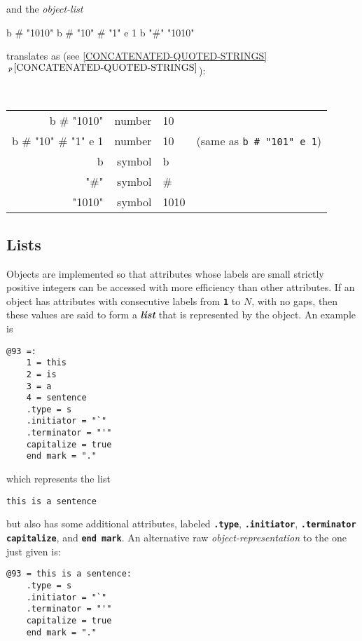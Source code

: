\documentclass[12pt]{article}
\newcommand{\TT}[1]{{\tt \bfseries #1}}
\newcommand{\key}[1]{{\bf \em #1}\index{#1}}
\newcommand{\secref}[1]{\ref{#1}$\,^{p\,\pageref{#1}}$}
\newenvironment{indpar}[1][0.3in]%
	{\begin{list}{}%
		     {\setlength{\itemsep}{0in}%
		      \setlength{\topsep}{0in}%
		      \setlength{\parsep}{1ex}%
		      \setlength{\labelwidth}{#1}%
		      \setlength{\leftmargin}{#1}%
		      \addtolength{\leftmargin}{\labelsep}}%
	 \item}%
	{\end{list}}
\begin{document}
and the {\em object-list}

\begin{center}
b \# "1010" b \# "10" \# "1" e 1 b "\#" "1010"
\end{center}
translates as (see \secref{CONCATENATED-QUOTED-STRINGS}):
\begin{center}
\tt
\begin{tabular}{r@{~~$\Longrightarrow$~~}rll}
b \# "1010"		& \rm number & 10 \\
b \# "10" \# "1" e 1	& \rm number & 10
			& \rm (same as {\tt b \# "101" e 1}) \\
b			& \rm symbol & b \\		
"\#"			& \rm symbol & \# \\		
"1010"			& \rm symbol & 1010 \\		
\end{tabular}
\end{center}


\subsection{Lists}

Objects are implemented so that attributes whose labels are small
strictly positive integers can be accessed with more efficiency
than other attributes.  If an object has attributes with consecutive
labels from \TT{1} to $N$, with no gaps,
then these values are said to form a \key{list} that is represented
by the object.  An example is

\begin{indpar}\begin{verbatim}
@93 =:
    1 = this
    2 = is
    3 = a
    4 = sentence
    .type = s
    .initiator = "`"
    .terminator = "'"
    capitalize = true
    end mark = "."
\end{verbatim}\end{indpar}

which represents the list
\begin{indpar}
\verb|this is a sentence|
\end{indpar}

but also has some additional attributes, labeled \TT{.type},
\TT{.initiator}, \TT{.terminator}
\TT{capitalize}, and \TT{end mark}.
An alternative raw {\em object-representation}
to the one just given is:

\begin{indpar}\begin{verbatim}
@93 = this is a sentence:
    .type = s
    .initiator = "`"
    .terminator = "'"
    capitalize = true
    end mark = "."
\end{verbatim}\end{indpar}
\end{document}
